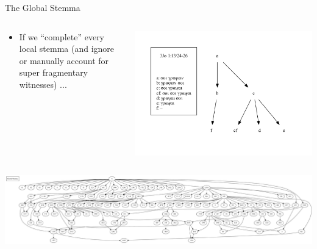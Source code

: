 \documentclass[10pt]{beamer}
\begin{document}
	\begin{frame}{The Global Stemma}
		\begin{columns}
			\begin{column}{0.45\textwidth}
				\begin{itemize}
					\item If we ``complete'' every local stemma (and ignore or manually account for super fragmentary witnesses) ...
				\end{itemize}
			\end{column}
			\begin{column}{0.45\textwidth}
				\begin{center}
					\includegraphics[width=\textwidth]{../graphics/B25K1V13U24-26-local-stemma-complete.pdf}
				\end{center}	
			\end{column}
		\end{columns}
		\begin{center}
			\includegraphics[width=\textwidth]{../graphics/global-stemma-complete.pdf}
		\end{center}	
	\end{frame}
\end{document}
